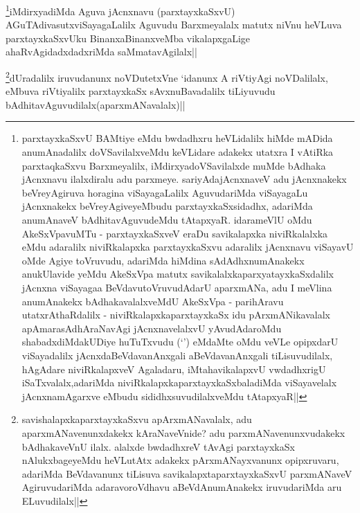 \begin{artha}
\footnote{parxtayxkaSxvU BAMtiye eMdu bwdadhxru heVLidalilx hiMde mADida anumAnadalilx doVSavilalxveMdu keVLidare adakekx utatxra I vAtiRka parxtaqkaSxvu Barxmeyalilx, iMdirxyadoVSavilalxde muMde bAdhaka jAcnxnavu ilalxdiralu adu parxmeye. sariyAdajAcnxnaveV adu jAcnxnakekx beVreyAgiruva horagina viSayagaLalilx AguvudariMda viSayagaLu jAcnxnakekx beVreyAgiveyeMbudu parxtayxkaSxsidadhx, adariMda anumAnaveV bAdhitavAguvudeMdu tAtapxyaR. idarameVlU oMdu AkeSxVpavuMTu - parxtayxkaSxveV eraDu savikalapxka niviRkalalxka eMdu adaralilx niviRkalapxka parxtayxkaSxvu adaralilx jAcnxnavu viSayavU oMde Agiye toVruvudu, adariMda hiMdina sAdAdhxnumAnakekx anukUlavide yeMdu AkeSxVpa matutx savikalalxkaparxyatayxkaSxdalilx jAcnxna viSayagaa BeVdavutoVruvudAdarU aparxmANa, adu I meVlina anumAnakekx bAdhakavalalxveMdU AkeSxVpa - parihAravu utatxrAthaRdalilx - niviRkalapxkaparxtayxkaSx idu pArxmANikavalalx apAmarasAdhAraNavAgi jAcnxnavelalxvU yAvudAdaroMdu shabadxdiMdakUDiye huTuTxvudu (`\stext') eMdaMte oMdu veVLe opipxdarU viSayadalilx jAcnxdaBeVdavanAnxgali aBeVdavanAnxgali tiLisuvudilalx, hAgAdare niviRkalapxveV Agaladaru, iMtahavikalapxvU vwdadhxrigU iSaTxvalalx,adariMda niviRkalapxkaparxtayxkaSxbaladiMda viSayavelalx jAcnxnamAgarxve eMbudu sididhxsuvudilalxveMdu tAtapxyaR||}iMdirxyadiMda Aguva jAcnxnavu (parxtayxkaSxvU) AGuTAdivasutxviSayagaLalilx Aguvudu Barxmeyalalx matutx niVnu heVLuva parxtayxkaSxvUku BinanxaBinanxveMba vikalapxgaLige ahaRvAgidadxdadxriMda saMmatavAgilalx||
\end{artha}

\begin{artha}
\footnote{savishalapxkaparxtayxkaSxvu apArxmANavalalx, adu  aparxmANavenunxdakekx kAraNaveVnide? adu parxmANavenunxvudakekx bAdhakaveVnU ilalx. alalxde bwdadhxreV tAvAgi parxtayxkaSx nAlukxbageyeMdu heVLutAtx adakekx pArxmANayxvanunx opipxruvaru, adariMda BeVdavanunx tiLisuva savikalapxtaparxtayxkaSxvU parxmANaveV AgiruvudariMda adaravoroVdhavu aBeVdAnumAnakekx iruvudariMda aru ELuvudilalx||}dUradalilx iruvudanunx noVDutetxVne `idanunx A riVtiyAgi noVDalilalx, eMbuva riVtiyalilx parxtayxkaSx sAvxnuBavadalilx tiLiyuvudu bAdhitavAguvudilalx(aparxmANavalalx)||
\end{artha}


